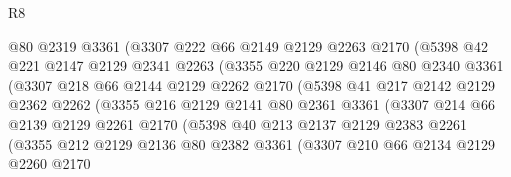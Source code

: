 \begin{lexlean}{R8}
\begin{coremodule}
                    @80
                    @2319
                    @3361
                    (@3307
                      @222
                      @66
                      @2149
                      @2129
                      @2263
                      @2170
                      (@5398
                        @42
                        @221
                        @2147
                        @2129
                        @2341
                        @2263
                        (@3355
                          @220
                          @2129
                          @2146
                          @80
                          @2340
                          @3361
                          (@3307
                            @218
                            @66
                            @2144
                            @2129
                            @2262
                            @2170
                            (@5398
                              @41
                              @217
                              @2142
                              @2129
                              @2362
                              @2262
                              (@3355
                                @216
                                @2129
                                @2141
                                @80
                                @2361
                                @3361
                                (@3307
                                  @214
                                  @66
                                  @2139
                                  @2129
                                  @2261
                                  @2170
                                  (@5398
                                    @40
                                    @213
                                    @2137
                                    @2129
                                    @2383
                                    @2261
                                    (@3355
                                      @212
                                      @2129
                                      @2136
                                      @80
                                      @2382
                                      @3361
                                      (@3307
                                        @210
                                        @66
                                        @2134
                                        @2129
                                        @2260
                                        @2170

\end{coremodule}
\end{lexlean}
